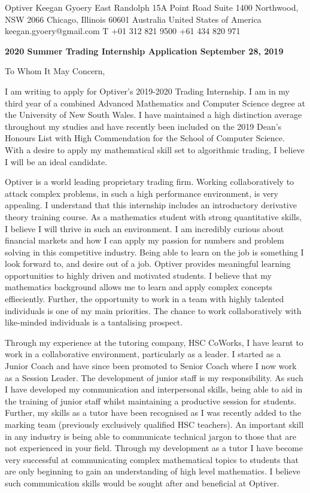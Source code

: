 \documentclass[a4paper,11pt]{article}
\begin{document}
 
Optiver \hfill Keegan Gyoery  East Randolph \hfill 15A Point Road \break
Suite 1400 \hfill Northwood, NSW 2066 \break
Chicago, Illinois 60601 \hfill Australia \break
United States of America \hfill keegan.gyoery@gmail.com \break
T +01 312 821 9500 \hfill +61 434 820 971 \break

\vspace{8mm}
\textbf{2020 Summer Trading Internship Application September 28, 2019} \par
To Whom It May Concern, \par

I am writing to apply for Optiver’s 2019-2020 Trading Internship. I am in my third year of a
combined Advanced Mathematics and Computer Science degree at the University of New South
Wales. I have maintained a high distinction average throughout my studies and have recently been
included on the 2019 Dean’s Honours List with High Commendation for the School of Computer
Science. With a desire to apply my mathematical skill set to algorithmic trading, I believe I will
be an ideal candidate.\par

Optiver is a world leading proprietary trading firm. Working collaboratively to attack complex
problems, in such a high performance environment, is very appealing. I understand that this internship includes an introductory derivative theory training course. As a mathematics student with
strong quantitative skills, I believe I will thrive in such an environment. I am incredibly curious about financial markets and how I can apply my passion for numbers and problem solving in this
competitive industry. Being able to learn on the job is something I look forward to, and desire out of a job. Optiver provides meaningful learning opportunities to highly driven and motivated students. I believe that my mathematics background allows me to learn and apply complex concepts effieciently. Further, the opportunity to work in a team with highly talented individuals is one of my main priorities. The chance to work collaboratively with like-minded individuals is a tantalising prospect.\par

Through my experience at the tutoring company, HSC CoWorks, I have learnt to work in a collaborative environment, particularly as a leader. I started as a Junior Coach and have since been promoted to Senior Coach where I now work as a Session Leader. The development of junior staff is my responsibility. As such I have developed my communication and interpersonal skills, being able to aid in the training of junior staff whilst maintaining a productive session for students. Further, my skills as a tutor have been recognised as I was recently added to the marking team (previously exclusively qualified HSC teachers). An important skill in any industry is being able to communicate technical jargon to those that are not experienced in your field. Through my development as a tutor I have become very successful at communicating complex mathematical topics to students that are only beginning to gain an understanding of high level mathematics. I believe such communication skills would be sought after and beneficial at Optiver.\par
\end{document}

